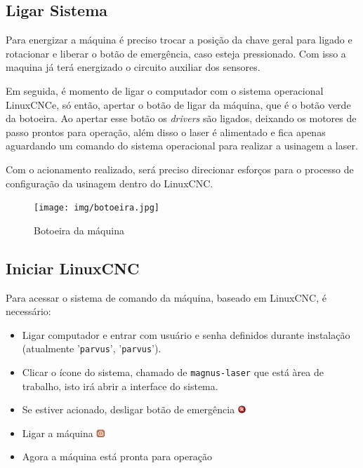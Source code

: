 \documentclass[
	article,			%
	11pt,				%
	oneside,			%
	a4paper,			%
	section=TITLE,		%
	english,			%
	brazil,				%
	sumario=tradicional
	]{abntex2}
\newcommand{\LCNC}{LinuxCNC}
\begin{document}
\subsection{Ligar Sistema}

Para energizar a máquina é preciso trocar a posição da chave geral para ligado e rotacionar e liberar o botão de emergência, caso esteja pressionado. Com isso a maquina já terá energizado o circuito auxiliar dos sensores.

Em seguida, é momento de ligar o computador com o sistema operacional \LCNC e, só então, apertar o botão de ligar da máquina, que é o botão verde da botoeira. Ao apertar esse botão os \textit{drivers} são ligados, deixando os motores de passo prontos para operação, além disso o laser é alimentado e fica apenas aguardando um comando do sistema operacional para realizar a usinagem a laser. 

Com o acionamento realizado, será preciso direcionar esforços para o processo de configuração da usinagem dentro do \LCNC.

\begin{figure}[H]
    \centering
    \texttt{[image: img/botoeira.jpg]}
    \caption{Botoeira da máquina}
    \label{fig:botoeira}
\end{figure}
 
\subsection{Iniciar \LCNC}

Para acessar o sistema de comando da máquina, baseado em \LCNC, é necessário:
\begin{itemize}
    \item Ligar computador e entrar com usuário e senha definidos durante instalação (atualmente '\texttt{parvus}', '\texttt{parvus}').
    \item Clicar o ícone do sistema, chamado de \texttt{magnus-laser} que está àrea de trabalho, isto irá abrir a interface do sistema.
    \item Se estiver acionado, desligar botão de emergência \includegraphics[height=0.3cm]{img/tool_estop.png}
    \item Ligar a máquina
    \includegraphics[height=0.3cm]{img/tool_power.png}
    \item Agora a máquina está pronta para operação
\end{itemize}
\end{document}
